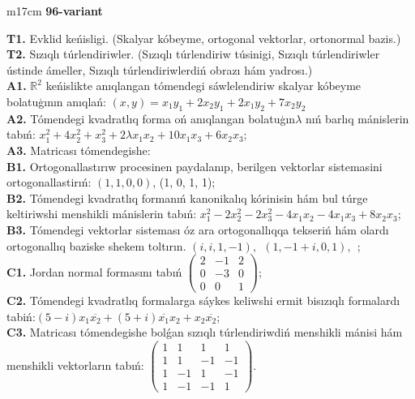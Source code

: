 \documentclass{article}
\begin{document}
\begin{tabular}{m{17cm}}
\textbf{96-variant}
\newline

\textbf{T1.} Evklid keńisligi. (Skalyar kóbeyme, ortogonal vektorlar, ortonormal bazis.) \\
\textbf{T2.} Sızıqlı túrlendiriwler.  (Sızıqlı túrlendiriw túsinigi, Sızıqlı túrlendiriwler ústinde ámeller, Sızıqlı túrlendiriwlerdiń obrazı hám yadrosı.) \\
\textbf{A1.} \(\mathbb{R}^{2}\) keńislikte anıqlangan tómendegi sáwlelendiriw skalyar kóbeyme bolatuģının anıqlań: \((x,y) = x_{1}y_{1} + 2x_{2}y_{1} + 2x_{1}y_{2} + 7x_{2}y_{2}\) \\
\textbf{A2.} Tómendegi kvadratlıq forma oń anıqlangan bolatuģın\(\lambda\) nıń barlıq mánislerin tabıń: \(x_{1}^{2} + 4x_{2}^{2} + x_{3}^{2} + 2\lambda x_{1}x_{2} + 10x_{1}x_{3} + 6x_{2}x_{3}\); \\
\textbf{A3.} Matricası tómendegishe: \\
\textbf{B1.} Ortogonallastırıw procesinen paydalanıp, berilgen vektorlar sistemasini ortogonallastirıń: \((1,1,0,0)\), (1, 0, 1, 1); \\
\textbf{B2.} Tómendegi kvadratlıq formanıń kanonikalıq kórinisin hám bul túrge keltiriwshi menshikli mánislerin tabıń: \(x_{1}^{2} - 2x_{2}^{2} - 2x_{3}^{2} - 4x_{1}x_{2} - 4x_{1}x_{3} + 8x_{2}x_{3}\); \\
\textbf{B3.} Tómendegi vektorlar sisteması óz ara ortogonallıqqa tekseriń hám olardı ortogonallıq baziske shekem toltırın. \((i,i,1, - 1),\ \ (1, - 1 + i,0,1),\ \ \); \\
\textbf{C1.} Jordan normal formasını tabıń \(\begin{pmatrix} 2 & - 1 & 2 \\ 0 & - 3 & 0 \\ 0 & 0 & 1 \end{pmatrix}\); \\
\textbf{C2.} Tómendegi kvadratlıq formalarga sáykes keliwshi ermit bisızıqlı formalardı tabiń:\((5 - i)x_{1}\overline{x_{2}} + (5 + i)\overline{x_{1}}x_{2} + x_{2}\overline{x_{2}}\); \\
\textbf{C3.} Matricası tómendegishe bolǵan sızıqlı túrlendiriwdiń menshikli mánisi hám menshikli vektorların tabıń: \(\begin{pmatrix} 1 & 1 & 1 & 1 \\ 1 & 1 & - 1 & - 1 \\ 1 & - 1 & 1 & - 1 \\ 1 & - 1 & - 1 & 1 \end{pmatrix}\). \\

\end{tabular}
\vspace{1cm}
\end{document}
